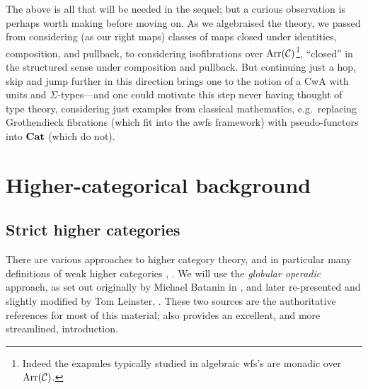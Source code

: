\begin{para}
The above is all that will be needed in the sequel; but a curious observation is perhaps worth making before moving on.  As we algebraised the theory, we passed from considering (as our right maps) classes of maps closed under identities, composition, and pullback, to considering isofibrations over $\mathrm{Arr}(\mathcal{C})$\footnote{Indeed the exapmles typically studied in algebraic wfs's are monadic over $\mathrm{Arr}(\mathcal{C})$.}, ``closed'' in the structured sense under composition and pullback.  But continuing just a hop, skip and jump further in this direction brings one to the notion of a CwA with units and $\Sigma$-types---and one could motivate this step never having thought of type theory, considering just examples from classical mathematics, e.g.\ replacing Grothendieck fibrations (which fit into the awfs framework) with pseudo-functors into $\mathbf{Cat}$ (which do not).
\end{para}

\section{Higher-categorical background}

\subsection{Strict higher categories}

There are various approaches to higher category theory, and in particular many definitions of weak higher categories \cite{leinster:ten-definitions}, \cite{cheng-lauda:guidebook}.  We will use the \emph{globular operadic} approach, as set out originally by Michael Batanin in \cite{batanin:natural-environment}, and later re-presented and slightly modified by Tom Leinster, \cite{leinster:book}.  These two sources are the authoritative references for most of this material; \cite{leinster:survey} also provides an excellent, and more streamlined, introduction.

